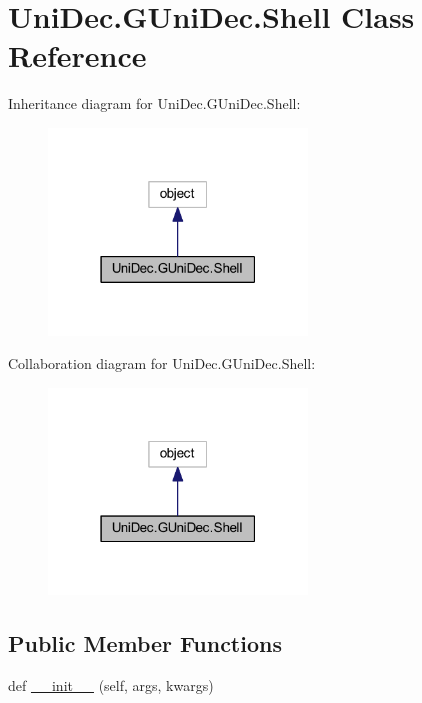 \hypertarget{class_uni_dec_1_1_g_uni_dec_1_1_shell}{}\section{Uni\+Dec.\+G\+Uni\+Dec.\+Shell Class Reference}
\label{class_uni_dec_1_1_g_uni_dec_1_1_shell}


Inheritance diagram for Uni\+Dec.\+G\+Uni\+Dec.\+Shell\+:\nopagebreak
\begin{figure}[H]
\begin{center}
\leavevmode
\includegraphics[width=195pt]{class_uni_dec_1_1_g_uni_dec_1_1_shell__inherit__graph}
\end{center}
\end{figure}


Collaboration diagram for Uni\+Dec.\+G\+Uni\+Dec.\+Shell\+:\nopagebreak
\begin{figure}[H]
\begin{center}
\leavevmode
\includegraphics[width=195pt]{class_uni_dec_1_1_g_uni_dec_1_1_shell__coll__graph}
\end{center}
\end{figure}
\subsection*{Public Member Functions}
\begin{DoxyCompactItemize}
\item 
def \hyperlink{class_uni_dec_1_1_g_uni_dec_1_1_shell_a574ce86e4262d4a287fa7de82f10fdb0}{\+\_\+\+\_\+init\+\_\+\+\_\+} (self, args, kwargs)
\end{DoxyCompactItemize}
